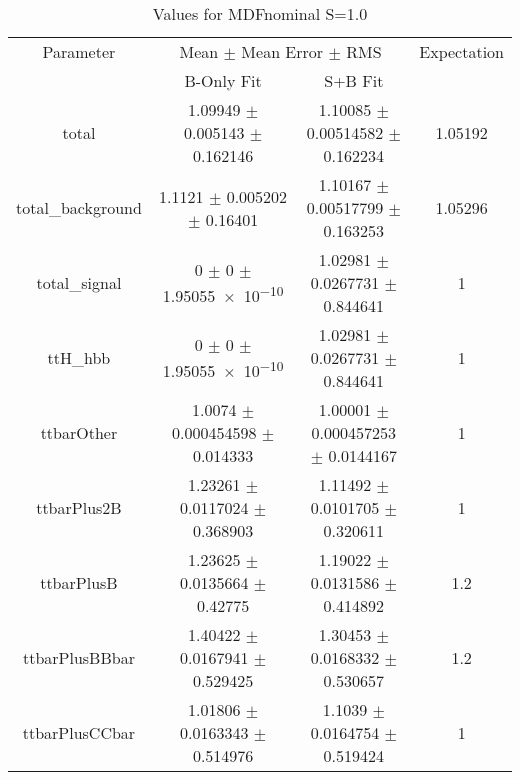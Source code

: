 \begin{table}
\centering
\caption{Values for MDFnominal S=1.0}
\begin{tabular}{cccc}
\toprule
Parameter & \multicolumn{2}{c}{Mean $\pm$ Mean Error $\pm$ RMS} & Expectation\\
 & B-Only Fit & S+B Fit & \\
\midrule
total & \num{1.09949} $\pm$ \num{0.005143} $\pm$ \num{0.162146} & \num{1.10085} $\pm$ \num{0.00514582} $\pm$ \num{0.162234} & \num{1.05192}\\
total\_background & \num{1.1121} $\pm$ \num{0.005202} $\pm$ \num{0.16401} & \num{1.10167} $\pm$ \num{0.00517799} $\pm$ \num{0.163253} & \num{1.05296}\\
total\_signal & \num{0} $\pm$ \num{0} $\pm$ \num{1.95055e-10} & \num{1.02981} $\pm$ \num{0.0267731} $\pm$ \num{0.844641} & \num{1}\\
ttH\_hbb & \num{0} $\pm$ \num{0} $\pm$ \num{1.95055e-10} & \num{1.02981} $\pm$ \num{0.0267731} $\pm$ \num{0.844641} & \num{1}\\
ttbarOther & \num{1.0074} $\pm$ \num{0.000454598} $\pm$ \num{0.014333} & \num{1.00001} $\pm$ \num{0.000457253} $\pm$ \num{0.0144167} & \num{1}\\
ttbarPlus2B & \num{1.23261} $\pm$ \num{0.0117024} $\pm$ \num{0.368903} & \num{1.11492} $\pm$ \num{0.0101705} $\pm$ \num{0.320611} & \num{1}\\
ttbarPlusB & \num{1.23625} $\pm$ \num{0.0135664} $\pm$ \num{0.42775} & \num{1.19022} $\pm$ \num{0.0131586} $\pm$ \num{0.414892} & \num{1.2}\\
ttbarPlusBBbar & \num{1.40422} $\pm$ \num{0.0167941} $\pm$ \num{0.529425} & \num{1.30453} $\pm$ \num{0.0168332} $\pm$ \num{0.530657} & \num{1.2}\\
ttbarPlusCCbar & \num{1.01806} $\pm$ \num{0.0163343} $\pm$ \num{0.514976} & \num{1.1039} $\pm$ \num{0.0164754} $\pm$ \num{0.519424} & \num{1}\\
\bottomrule
\end{tabular}
\end{table}